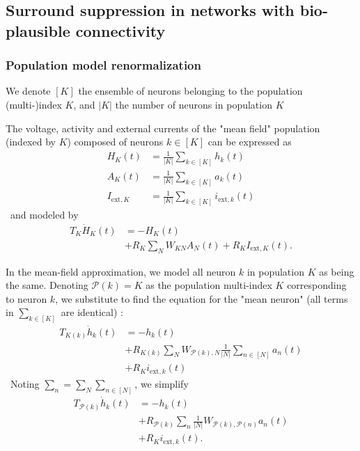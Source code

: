\documentclass[10pt,conference,compsocconf,a4paper]{IEEEtran}
\begin{document}
	\subsection{Surround suppression in networks with bio-plausible connectivity}
	\label{sec23}

		\subsubsection{Population model renormalization}
		\label{sec231}

			We denote $[K]$ the ensemble of neurons belonging to the population (multi-)index $K$, and $|K|$ the number of neurons in population $K$

			The voltage, activity and external currents of the "mean field" population (indexed by $K$) composed of neurons $k \in [K]$ can be expressed as
\
			\begin{equation*}
				\begin{aligned}
					H_K(t) &= \frac{1}{|K|} \sum_{k \in [K]} h_k(t)\\
					A_K(t) &= \frac{1}{|K|} \sum_{k \in [K]} a_k(t)\\
					I_{\text{ext},K} &= \frac{1}{|K|} \sum_{k \in [K]} i_{\text{ext},k}(t)
				\end{aligned}
			\end{equation*}
\
			and modeled by 
\
			\begin{equation*}
				\begin{aligned}
					T_K \dot H_K(t) &= -H_K(t) \\ &+ R_K \sum_{N} W_{KN} A_N(t) + R_K I_{\text{ext},K}(t).
				\end{aligned}
			\end{equation*}

			In the mean-field approximation, we model all neuron $k$ in population $K$ as being the same. Denoting $\mathcal P(k) = K$ as the population multi-index $K$ corresponding to neuron $k$, we substitute to find the equation for the "mean neuron" (all terms in $\sum_{k \in [K]}$ are identical) :
\
			\begin{equation*}
				\begin{aligned}
					T_{K(k)} \dot h_k(t) &= - h_k(t) \\ &+ R_{K(k)} \sum_N W_{\mathcal P(k),N} \frac{1}{|N|} \sum_{n \in [N]} a_n(t) \\ &+ R_K i_{\text{ext},k}(t)
				\end{aligned}
			\end{equation*}
\
			Noting $\sum_n = \sum_N \sum_{n \in [N]}$, we simplify
\
			\begin{equation*}
				\begin{aligned}
					T_{\mathcal P(k)} \dot h_k(t) &= - h_k(t) \\ &+ R_{\mathcal P(k)} \sum_n \frac{1}{|N|} W_{\mathcal P(k),\mathcal P(n)} a_n(t) \\ &+ R_K i_{\text{ext},k}(t).
				\end{aligned}
			\end{equation*}
\end{document}
